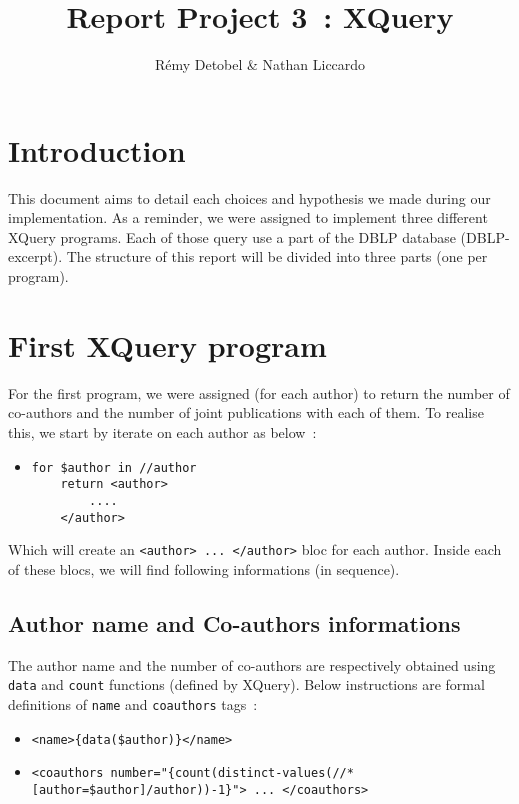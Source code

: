 \documentclass{article}
\author{R\'emy Detobel \& Nathan Liccardo}
\title{Report Project 3~: XQuery}
\begin{document}
\maketitle

\section{Introduction}
  This document aims to detail each choices and hypothesis we made during our implementation. As a reminder, we were assigned to implement three different XQuery programs. Each of those query use a part of the DBLP database (DBLP-excerpt). The structure of this report will be divided into three parts (one per program).

\section{First XQuery program}
  For the first program, we were assigned (for each author) to return the number of co-authors and the number of joint publications with each of them. To realise this, we start by iterate on each author as below~: 
  \begin{itemize}
    \item \begin{verbatim}
for $author in //author
    return <author>
        ....
    </author>\end{verbatim}
  \end{itemize}
  Which will create an \verb|<author> ... </author>| bloc for each author. Inside each of these blocs, we will find following informations (in sequence).
  
  \subsection{Author name and Co-authors informations}
    The author name and the number of co-authors are respectively obtained using \verb|data| and \verb|count| functions (defined by XQuery). Below instructions are formal definitions of \verb|name| and \verb|coauthors| tags~:
    \begin{itemize}
      \item \verb|<name>{data($author)}</name>|
      \item \verb|<coauthors number="{count(distinct-values(//*[author=$author]/author))-1}"> ... </coauthors>|
    \end{itemize}
    
\end{document}
